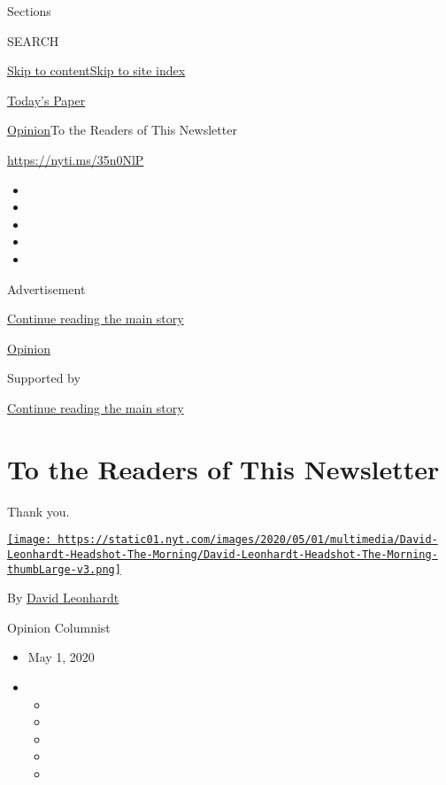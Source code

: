 Sections

SEARCH

\protect\hyperlink{site-content}{Skip to
content}\protect\hyperlink{site-index}{Skip to site index}

\href{https://myaccount.nytimes.com/auth/login?response_type=cookie\&client_id=vi}{}

\href{https://www.nytimes.com/section/todayspaper}{Today's Paper}

\href{/section/opinion}{Opinion}\textbar{}To the Readers of This
Newsletter

\href{https://nyti.ms/35n0NlP}{https://nyti.ms/35n0NlP}

\begin{itemize}
\item
\item
\item
\item
\item
\end{itemize}

Advertisement

\protect\hyperlink{after-top}{Continue reading the main story}

\href{/section/opinion}{Opinion}

Supported by

\protect\hyperlink{after-sponsor}{Continue reading the main story}

\hypertarget{to-the-readers-of-this-newsletter}{%
\section{To the Readers of This
Newsletter}\label{to-the-readers-of-this-newsletter}}

Thank you.

\href{https://www.nytimes.com/by/david-leonhardt}{\texttt{[image: https://static01.nyt.com/images/2020/05/01/multimedia/David-Leonhardt-Headshot-The-Morning/David-Leonhardt-Headshot-The-Morning-thumbLarge-v3.png]}}

By \href{https://www.nytimes.com/by/david-leonhardt}{David Leonhardt}

Opinion Columnist

\begin{itemize}
\item
  May 1, 2020
\item
  \begin{itemize}
  \item
  \item
  \item
  \item
  \item
  \end{itemize}
\end{itemize}

